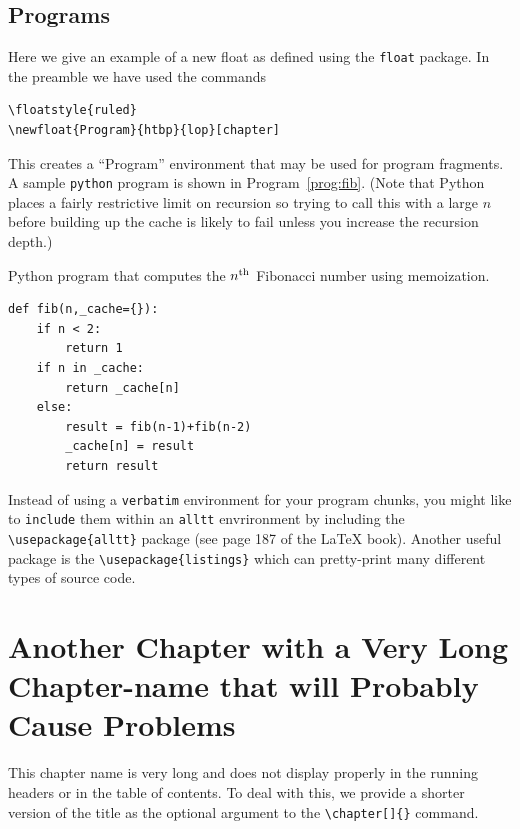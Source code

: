 \documentclass[msc,oneside]{ubcthesis}
\theoremstyle{definition}
\begin{document}
\section{Programs}
Here we give an example of a new float as defined using the
\texttt{float} package.  In the preamble we have used the commands
\begin{verbatim}
\floatstyle{ruled}
\newfloat{Program}{htbp}{lop}[chapter]
\end{verbatim}
This creates a ``Program'' environment that may be used for program
fragments.  A sample \texttt{python} program is shown in
Program~\ref{prog:fib}.  (Note that Python places a fairly restrictive
limit on recursion so trying to call this with a large $n$ before
building up the cache is likely to fail unless you increase the
recursion depth.)
\begin{Program}
  \caption{\label{prog:fib} Python program that computes the $n^{\rm
      th}$ Fibonacci number using memoization.}
\begin{verbatim}
def fib(n,_cache={}):
    if n < 2:
        return 1
    if n in _cache:
        return _cache[n]
    else:
        result = fib(n-1)+fib(n-2)
        _cache[n] = result
        return result
\end{verbatim}
\end{Program}
Instead of using a \texttt{verbatim} environment for your program
chunks, you might like to \texttt{include} them within an
\texttt{alltt} envrironment by including the \verb|\usepackage{alltt}|
package (see page 187 of the \LaTeX{} book).  Another useful package
is the \verb|\usepackage{listings}| which can pretty-print many
different types of source code.

\newpage

\chapter[Another Chapter\ldots]{Another Chapter with a Very Long
  Chapter-name that will Probably Cause Problems}
\label{cha:apple_ref}

This chapter name is very long and does not display properly in the
running headers or in the table of contents.  To deal with this, we
provide a shorter version of the title as the optional argument to the
\verb|\chapter[]{}| command.
\end{document}
